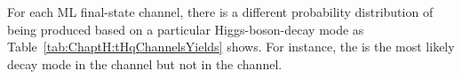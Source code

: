 
For each ML final-state channel, there is a different probability distribution of being produced based on a particular Higgs-boson-decay mode as
Table~\ref{tab:ChaptH:tHqChannelsYields} shows. For instance, the \Htautau is the most likely decay mode in the
\lepditau channel but not in the \trilep channel. 

